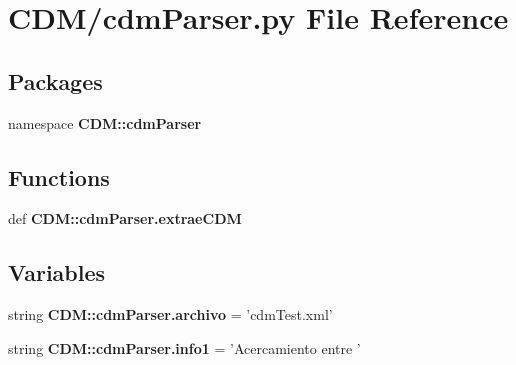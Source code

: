 \section{\-C\-D\-M/cdm\-Parser.py \-File \-Reference}
\label{cdm_parser_8py}
\subsection*{\-Packages}
\begin{DoxyCompactItemize}
\item 
namespace {\bf \-C\-D\-M\-::cdm\-Parser}
\end{DoxyCompactItemize}
\subsection*{\-Functions}
\begin{DoxyCompactItemize}
\item 
def {\bf \-C\-D\-M\-::cdm\-Parser.\-extrae\-C\-D\-M}
\end{DoxyCompactItemize}
\subsection*{\-Variables}
\begin{DoxyCompactItemize}
\item 
string {\bf \-C\-D\-M\-::cdm\-Parser.\-archivo} = 'cdm\-Test.\-xml'
\item 
string {\bf \-C\-D\-M\-::cdm\-Parser.\-info1} = '\-Acercamiento entre '
\end{DoxyCompactItemize}
